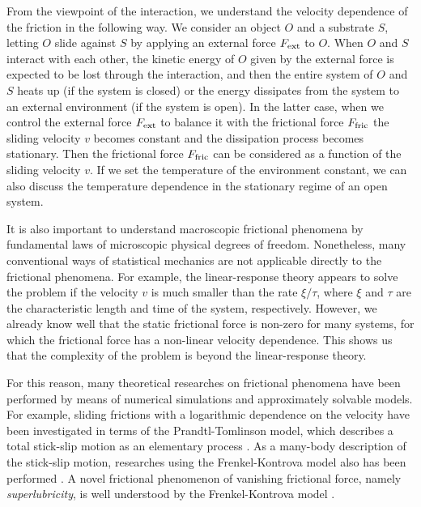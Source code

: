 From the viewpoint of the interaction, we understand the velocity dependence of the friction in the following way. We consider an object $O$ and a substrate $S$, letting $O$ slide against $S$ by applying an external force $F_{\rm ext}$ to $O$. When $O$ and $S$ interact with each other, the kinetic energy of $O$ given by the external force is expected to be lost through the interaction, and then the entire system of $O$ and $S$ heats up (if the system is closed) or the energy dissipates from the system to an external environment (if the system is open). In the latter case, when we control the external force $F_{\rm ext}$ to balance it with the frictional force $F_{\rm fric}$ the sliding velocity $v$ becomes constant and the dissipation process becomes stationary. Then the frictional force $F_{\rm fric}$ can be considered as a function of the sliding velocity $v$. If we set the temperature of the environment constant, we can also discuss the temperature dependence in the stationary regime of an open system.

It is also important to understand macroscopic frictional phenomena by fundamental laws of microscopic physical degrees of freedom.
Nonetheless, many conventional ways of statistical mechanics are not applicable directly to the frictional phenomena. For example, the linear-response theory appears to solve the problem if the velocity $v$ is much smaller than the rate $\xi/\tau$, where $\xi$ and $\tau$ are the characteristic length and time of the system, respectively. However, we already know well that the static frictional force is non-zero for many systems, for which the frictional force has a non-linear velocity dependence. This shows us that the complexity of the problem is beyond the linear-response theory.

For this reason, many theoretical researches on frictional phenomena have been performed by means of numerical simulations and approximately solvable models. For example, sliding frictions with a logarithmic dependence on the velocity have been investigated in terms of the Prandtl-Tomlinson model, which describes a total stick-slip motion as an elementary process \cite{Li2011,Sang2001,Schirmeisen2005,Muser2011,Xu2011,Jansen2010}. As a many-body description of the stick-slip motion, researches using the Frenkel-Kontrova model also has been performed \cite{Braun2011,Elmer1994a,Zheng1998,Bhattacharya2013}. A novel frictional phenomenon of vanishing frictional force, namely \textit{superlubricity}, is well understood by the Frenkel-Kontrova model \cite{Wang2008,Benassi2015}. 

